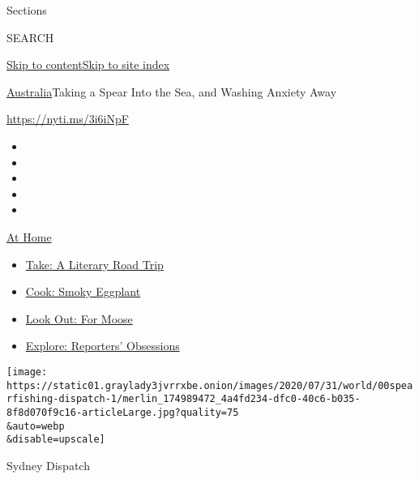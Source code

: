 Sections

SEARCH

\protect\hyperlink{site-content}{Skip to
content}\protect\hyperlink{site-index}{Skip to site index}

\href{/section/world/australia}{Australia}\textbar{}Taking a Spear Into
the Sea, and Washing Anxiety Away

\url{https://nyti.ms/3i6iNpF}

\begin{itemize}
\item
\item
\item
\item
\item
\end{itemize}

\href{https://www.nytimes3xbfgragh.onion/spotlight/at-home?action=click\&pgtype=Article\&state=default\&region=TOP_BANNER\&context=at_home_menu}{At
Home}

\begin{itemize}
\tightlist
\item
  \href{https://www.nytimes3xbfgragh.onion/2020/07/28/books/time-for-a-literary-road-trip.html?action=click\&pgtype=Article\&state=default\&region=TOP_BANNER\&context=at_home_menu}{Take:
  A Literary Road Trip}
\item
  \href{https://www.nytimes3xbfgragh.onion/2020/07/29/magazine/bored-with-your-home-cooking-some-smoky-eggplant-will-fix-that.html?action=click\&pgtype=Article\&state=default\&region=TOP_BANNER\&context=at_home_menu}{Cook:
  Smoky Eggplant}
\item
  \href{https://www.nytimes3xbfgragh.onion/2020/07/27/travel/moose-michigan-isle-royale.html?action=click\&pgtype=Article\&state=default\&region=TOP_BANNER\&context=at_home_menu}{Look
  Out: For Moose}
\item
  \href{https://www.nytimes3xbfgragh.onion/interactive/2020/at-home/even-more-reporters-editors-diaries-lists-recommendations.html?action=click\&pgtype=Article\&state=default\&region=TOP_BANNER\&context=at_home_menu}{Explore:
  Reporters' Obsessions}
\end{itemize}

\texttt{[image: https://static01.graylady3jvrrxbe.onion/images/2020/07/31/world/00spearfishing-dispatch-1/merlin\_174989472\_4a4fd234-dfc0-40c6-b035-8f8d070f9c16-articleLarge.jpg?quality=75\\\&auto=webp\\\&disable=upscale]}

Sydney Dispatch

